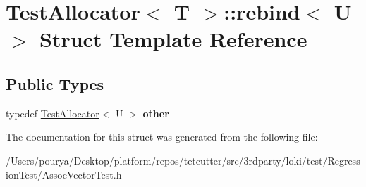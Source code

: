 \hypertarget{structTestAllocator_1_1rebind}{}\section{Test\+Allocator$<$ T $>$\+:\+:rebind$<$ U $>$ Struct Template Reference}
\label{structTestAllocator_1_1rebind}
\subsection*{Public Types}
\begin{DoxyCompactItemize}
\item 
\hypertarget{structTestAllocator_1_1rebind_ae33ce559b20109515f531cd4f72713c2}{}typedef \hyperlink{classTestAllocator}{Test\+Allocator}$<$ U $>$ {\bfseries other}\label{structTestAllocator_1_1rebind_ae33ce559b20109515f531cd4f72713c2}

\end{DoxyCompactItemize}


The documentation for this struct was generated from the following file\+:\begin{DoxyCompactItemize}
\item 
/\+Users/pourya/\+Desktop/platform/repos/tetcutter/src/3rdparty/loki/test/\+Regression\+Test/Assoc\+Vector\+Test.\+h\end{DoxyCompactItemize}
